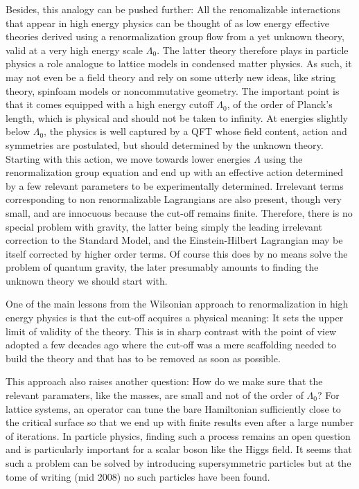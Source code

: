 \documentclass[12pt,here,feynmf]{article}
\begin{document}
Besides, this analogy can be pushed further: All the renomalizable interactions that appear in high energy physics can be thought of as low energy effective theories derived using  a renormalization group flow from a yet unknown theory, valid at a very high energy scale $\Lambda_{0}$. The latter theory therefore plays in particle physics a role analogue to lattice models in condensed matter physics. As such, it may not even be a field theory and rely on some utterly new ideas, like string theory, spinfoam models or noncommutative geometry. The important point is that it comes equipped with a high energy cutoff $\Lambda_{0}$, of the order of Planck's length, which is physical and should not be taken to infinity. At energies slightly  below $\Lambda_{0}$, the physics is well captured by a QFT whose field content, action and symmetries are postulated, but should determined by the unknown theory. Starting with this action, we move towards  lower energies $\Lambda$ using the renormalization group equation and end up with an effective action determined by a few relevant parameters to be experimentally determined. Irrelevant terms corresponding to non renormalizable Lagrangians are also present, though very small, and are innocuous because the cut-off remains finite. Therefore, there is no special problem with gravity, the latter being simply the leading irrelevant correction to the Standard Model, and the Einstein-Hilbert Lagrangian  may be itself corrected by higher order terms. Of course this does by no means solve the problem of quantum gravity, the later presumably amounts to finding the unknown theory we should start with. 

One of the main lessons from the Wilsonian approach to renormalization in high energy physics is that the cut-off acquires a physical meaning: It sets the upper limit of validity of the theory. This is in sharp contrast with the point of view adopted a few decades ago where the cut-off was a mere scaffolding needed to build the theory and that has to be removed as soon as possible. 


This approach also raises another question: How do we make sure that the relevant paramaters, like the masses, are small and not of the order of $\Lambda_{0}$? For lattice systems, an operator can tune the bare Hamiltonian sufficiently close to the critical surface so that we end up with finite results even after a large number of iterations. In particle physics, finding such a process remains an open question and is  particularly important for a scalar boson like the Higgs field. It seems that such a problem can be solved by introducing supersymmetric particles but at the tome of writing (mid 2008) no such particles have been found. 
\end{document}
